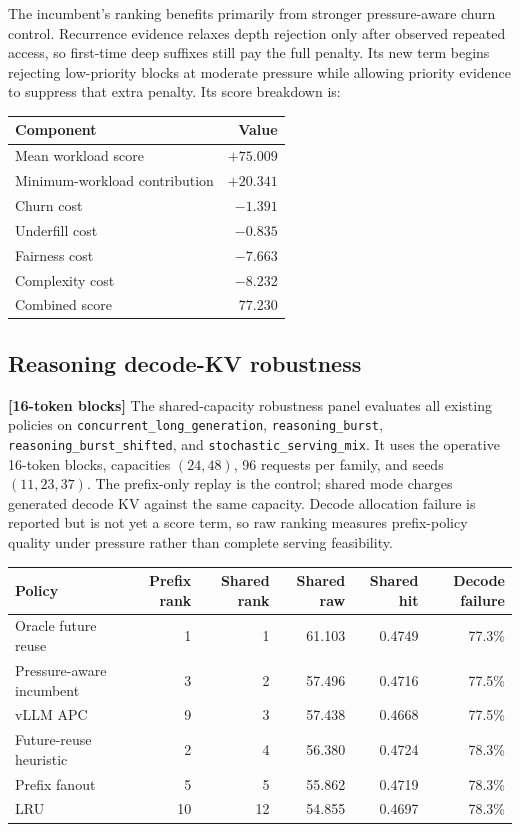 \documentclass[11pt]{article}
\newcommand{\identifier}[1]{\nolinkurl{#1}}
\newcommand{\blocktag}[1]{\textbf{\color{navy}[#1-token blocks]}}
\begin{document}
The incumbent's ranking benefits primarily from stronger pressure-aware churn control.
Recurrence evidence relaxes depth rejection only after observed repeated access, so
first-time deep suffixes still pay the full penalty.  Its new term begins rejecting
low-priority blocks at moderate pressure while allowing priority evidence to suppress
that extra penalty. Its score breakdown is:

\begin{center}
\begin{tabular}{lr}
\toprule
\textbf{Component} & \textbf{Value} \\
\midrule
Mean workload score & \(+75.009\) \\
Minimum-workload contribution & \(+20.341\) \\
Churn cost & \(-1.391\) \\
Underfill cost & \(-0.835\) \\
Fairness cost & \(-7.663\) \\
Complexity cost & \(-8.232\) \\
\midrule
Combined score & \(\mathbf{77.230}\) \\
\bottomrule
\end{tabular}
\end{center}

\subsection{Reasoning decode-KV robustness}
\label{sec:reasoning-kv-robustness}

\blocktag{16} The shared-capacity robustness panel evaluates all existing policies on
\identifier{concurrent_long_generation}, \identifier{reasoning_burst},
\identifier{reasoning_burst_shifted}, and \identifier{stochastic_serving_mix}.  It
uses the operative 16-token blocks, capacities \((24,48)\), 96 requests per family,
and seeds \((11,23,37)\).  The prefix-only replay is the control; shared mode charges
generated decode KV against the same capacity.  Decode allocation failure is reported
but is not yet a score term, so raw ranking measures prefix-policy quality under
pressure rather than complete serving feasibility.

\begin{center}
\small
\begin{tabular}{lrrrrr}
\toprule
\textbf{Policy} & \textbf{Prefix rank} & \textbf{Shared rank} &
\textbf{Shared raw} & \textbf{Shared hit} & \textbf{Decode failure} \\
\midrule
Oracle future reuse & 1 & 1 & 61.103 & 0.4749 & 77.3\% \\
Pressure-aware incumbent & 3 & 2 & 57.496 & 0.4716 & 77.5\% \\
vLLM APC & 9 & 3 & 57.438 & 0.4668 & 77.5\% \\
Future-reuse heuristic & 2 & 4 & 56.380 & 0.4724 & 78.3\% \\
Prefix fanout & 5 & 5 & 55.862 & 0.4719 & 78.3\% \\
LRU & 10 & 12 & 54.855 & 0.4697 & 78.3\% \\
\bottomrule
\end{tabular}
\end{center}
\end{document}
